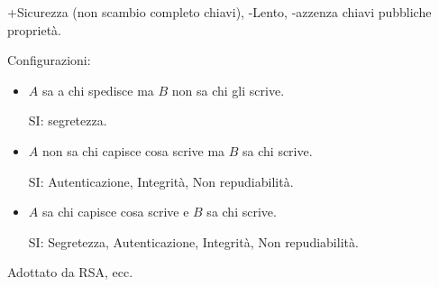 +Sicurezza (non scambio completo chiavi), -Lento, -azzenza chiavi pubbliche proprietà.

Configurazioni:
\begin{itemize}
	\item $A$ sa a chi spedisce ma $B$ non sa chi gli scrive.
		\begin{center}
		\end{center}

		SI: segretezza.

	\item $A$ non sa chi capisce cosa scrive ma $B$ sa chi scrive.
		\begin{center}
		\end{center}

	SI: Autenticazione, Integrità, Non repudiabilità.

	\item $A$ sa chi capisce cosa scrive e $B$ sa chi scrive.

	\begin{center}
	\end{center}

	SI: Segretezza, Autenticazione, Integrità, Non repudiabilità.
\end{itemize}
Adottato da RSA, ecc.

